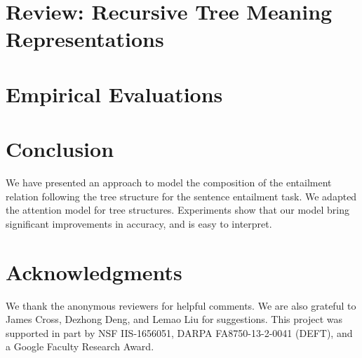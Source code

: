 \documentclass[11pt,letterpaper]{article}
\begin{document}
\section{Review: Recursive Tree Meaning Representations}
\label{sec:treelstm}


\section{Empirical Evaluations}
\label{sec:exp}


\iffalse
\section{Discussion}
\label{sec:disc}

\fi

\section{Conclusion}
\label{sec:conclusion}
We have presented an approach to model the composition
of the entailment relation following the tree structure for the sentence entailment task. We adapted the attention model
for tree structures. Experiments show that
our model bring significant improvements in accuracy,
and is easy to interpret.

\section*{Acknowledgments}
We thank the anonymous reviewers for helpful comments.
We are also grateful to James Cross, Dezhong Deng, and Lemao Liu for suggestions.
This project was supported in part
by NSF IIS-1656051, DARPA FA8750-13-2-0041
(DEFT), and a Google Faculty Research Award.



\end{document}
